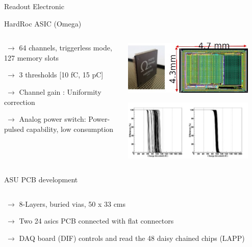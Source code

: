 \documentclass[10pt]{beamer}
\begin{document}
\begin{frame}[shrink=3]{Readout Electronic}
  \begin{block}{HardRoc ASIC (Omega)}
    \begin{columns}
      \begin{column}{0.5\textwidth}
        {\small 
          \par $ ~ \rightarrow$ 64 channels, triggerless mode, 127 memory slots
          \par $ ~\rightarrow$  3 thresholds [10 fC,  15 pC]
          \par $ ~\rightarrow$  Channel gain : Uniformity correction
          \par $ ~\rightarrow$  Analog power switch: Power-pulsed capability, low consumption

        }
      \end{column}

      \begin{column}{0.5\textwidth}
        \centerline{\includegraphics[width=0.9\textwidth]{jpg/HR2Chip}}
        \centerline{\includegraphics[width=0.9\textwidth]{jpg/HR2GainAdjustement}}
      \end{column}

    \end{columns}
  \end{block}
  \pause
  \begin{block}{ASU PCB development}
    \begin{columns}
      \begin{column}{0.5\textwidth}
        {\small 
          \par $ ~ \rightarrow$ 8-Layers, buried vias, 50 x 33 cms
          \par $ ~\rightarrow$  Two 24 asics PCB connected with flat connectors
          \par $ ~\rightarrow$  DAQ board (DIF) controls and read the 48 daisy chained chips (LAPP)
        }
      \end{column}


\end{columns}
\end{block}
\end{frame}
\end{document}
